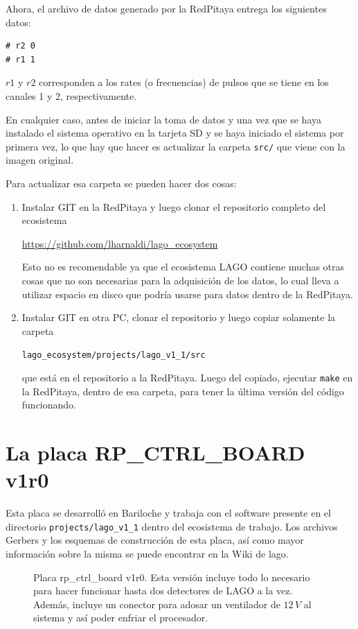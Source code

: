 \documentclass[a4paper,11pt]{article}
\begin{document}
Ahora, el archivo de datos generado por la RedPitaya entrega los siguientes
datos:

\begin{verbatim}
# r2 0
# r1 1
\end{verbatim}

\noindent $r1$ y $r2$ corresponden a los rates (o frecuencias) de pulsos que se
tiene en los canales 1 y 2, respectivamente.

En cualquier caso, antes de iniciar la toma de datos y una vez que se haya
instalado el sistema operativo en la tarjeta SD y se haya iniciado el sistema
por primera vez, lo que hay que hacer es actualizar la carpeta \texttt{src/} que
viene con la imagen original. 

Para actualizar esa carpeta se pueden hacer dos cosas:
\begin{enumerate}
				\item Instalar GIT en la RedPitaya y luego clonar el repositorio
								completo del ecosistema

								\href{https://github.com/lharnaldi/lago\_ecosystem}{https://github.com/lharnaldi/lago\_ecosystem} 

								Esto no es recomendable ya que el ecosistema LAGO contiene
								muchas otras cosas que no son necesarias para la adquisición de
								los datos, lo cual lleva a utilizar espacio en disco que podría
								usarse para datos dentro de la RedPitaya.
				\item Instalar GIT en otra PC, clonar el repositorio y luego copiar
								solamente la carpeta 

								\texttt{lago\_ecosystem/projects/lago\_v1\_1/src} 
								
								que está en el
								repositorio a la RedPitaya. Luego del copiado, ejecutar
								\texttt{make} en la RedPitaya, dentro de esa carpeta, para tener
								la última versión del código funcionando.
\end{enumerate}
\section{La placa RP\_CTRL\_BOARD v1r0}
Esta placa se desarrolló en Bariloche y trabaja con el software presente en el
directorio \texttt{projects/lago\_v1\_1} dentro del ecosistema de trabajo. Los
archivos Gerbers y los esquemas de construcción de esta placa, así como mayor
información sobre la misma se puede encontrar en la Wiki de lago.

\begin{figure}[!h]
  \centering
  \caption{Placa rp\_ctrl\_board v1r0. Esta versión incluye todo lo necesario
para hacer funcionar hasta dos detectores de LAGO a la vez. Además, incluye un
conector para adosar un ventilador de $12\,V$ al sistema y así poder enfriar el
procesador.}
  \label{fig:rp_ctrl_board_photo}
\end{figure}
\end{document}
